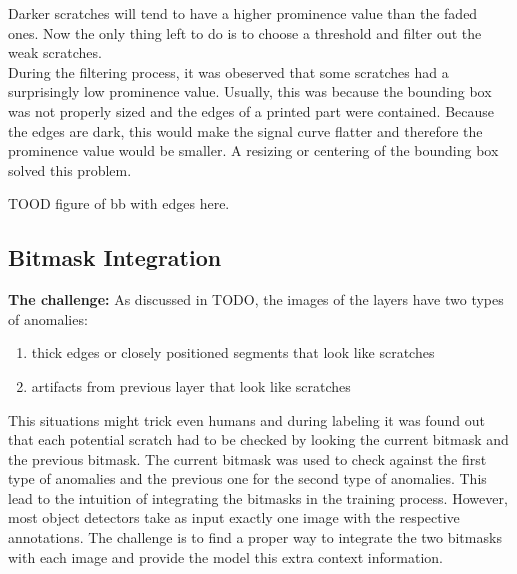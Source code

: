 Darker scratches will tend to have a higher prominence value than the faded ones. Now the only thing left to do is to choose a threshold and filter out the weak scratches. \\
During the filtering process, it was obeserved that some scratches had a surprisingly low prominence value. Usually, this was because the bounding box was not properly sized and the edges of a printed part were contained. Because the edges are dark, this would make the signal curve flatter and therefore the prominence value would be smaller. A resizing or centering of the bounding box solved this problem.

TOOD figure of bb with edges here. \\


\subsection{Bitmask Integration}

\textbf{The challenge:}
As discussed in TODO, the images of the layers have two types of anomalies:
\begin{enumerate}
\item thick edges or closely positioned segments that look like scratches
\item artifacts from previous layer that look like scratches
\end{enumerate}

This situations might trick even humans and during labeling it was found out that each potential scratch had to be checked by looking the current bitmask and the previous bitmask. The current bitmask was used to check against the first type of anomalies and the previous one for the second type of anomalies. This lead to the intuition of integrating the bitmasks in the training process.
 However, most object detectors take as input exactly one image with the respective annotations. The challenge is to find a proper way to integrate the two bitmasks with each image and provide the model this extra context information.


